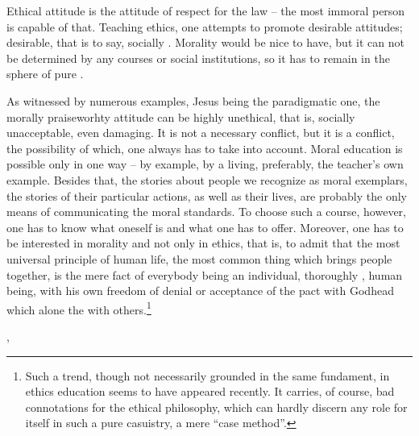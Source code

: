 {{\pa Ethical attitude is the attitude of respect for the law -- the
most immoral person is capable of that.  Teaching ethics, one attempts
to promote desirable attitudes; desirable, that is to say, socially
.  Morality would be nice to have, but it can not be
determined by any courses or social institutions, so it has to remain in
the sphere of pure .

As witnessed by numerous examples, Jesus being the paradigmatic one,
the morally praiseworhty attitude can be highly unethical, that is,
socially unacceptable, even damaging.  It is not a necessary conflict,
but it is a conflict, the possibility of which, one always has to take
into account.  Moral education is possible only in one way -- by
example, by a living, preferably, the teacher's own
example.  Besides that, the  stories about people we
recognize as moral exemplars, the stories of their particular actions,
as well as their lives, are probably the only means of communicating
the moral standards.  
To choose such a  course, however, one has to know what 
oneself is and what one has to offer. Moreover, 
one has to be
interested in morality and not only in ethics, that is, to admit that
the most universal principle of human life, the most common thing
which brings people together, is the mere fact of everybody being an
individual, thoroughly , human being, with his own
freedom of denial or acceptance of the  pact with
Godhead which alone  the  with
others.\footnote{Such a trend, though not necessarily grounded in the
same fundament, in ethics education seems to have appeared recently. 
It carries, of course, bad connotations for the ethical philosophy,
which can hardly discern any role for itself in such a pure casuistry,
a mere ``case method''.}


\sep

}}
